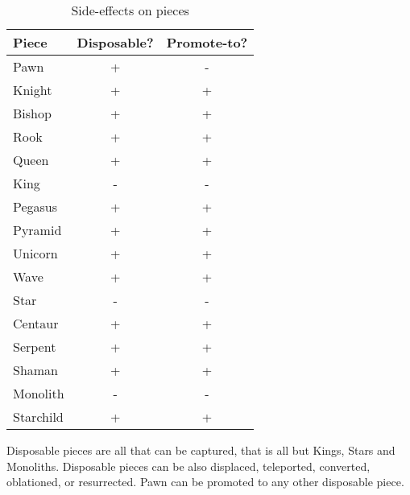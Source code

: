 \begin{table}[!h]
\centering
\begin{tabular}{ lcc }
\toprule %
\textbf{Piece} & \textbf{Disposable?} & \textbf{Promote-to?}  \\
\midrule %
Pawn           & +                    & -                     \\
Knight         & +                    & +                     \\
Bishop         & +                    & +                     \\
Rook           & +                    & +                     \\
Queen          & +                    & +                     \\
King           & -                    & -                     \\
\cmidrule{1-3} %
Pegasus        & +                    & +                     \\
Pyramid        & +                    & +                     \\
Unicorn        & +                    & +                     \\
Wave           & +                    & +                     \\
Star           & -                    & -                     \\
Centaur        & +                    & +                     \\
Serpent        & +                    & +                     \\
Shaman         & +                    & +                     \\
Monolith       & -                    & -                     \\
Starchild      & +                    & +                     \\
\bottomrule %
\end{tabular}
\caption{Side-effects on pieces}
\label{tbl:Appendix/Summary/Side-effects/Side-effects on pieces}
\end{table}

Disposable pieces are all that can be captured, that is all but Kings, Stars and Monoliths.
Disposable pieces can be also displaced, teleported, converted, oblationed, or resurrected.
Pawn can be promoted to any other disposable piece.

